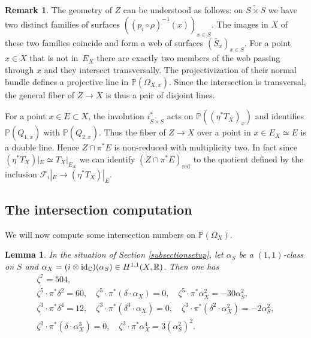 \documentclass[11pt]{article}
\let\mathcal\mathscr
\theoremstyle{plain}
\newtheorem{lemma}[theorem]{Lemma}
\theoremstyle{definition}
\newtheorem{remark}[theorem]{Remark}
\newcommand{\R}{\ensuremath{\mathbb{R}}}
\newcommand{\PP}{\ensuremath{\mathbb{P}}}
\newcommand{\fibre}[2]{\ensuremath{#1^{-1} (#2)}}
\newcommand\sF{{\mathcal F}}
\newcommand{\blS}{\ensuremath{\widetilde{S \times S}}}
\DeclareMathOperator{\id}{id}
\begin{document}
\begin{remark}
The geometry of $Z$ can be understood as follows: on $\blS$ we have two distinct families
of surfaces $(\fibre{(p_i \circ \rho)}{x})_{x \in S}$. The images in $X$ of these two families
coincide
and form a web of surfaces $(\bar S_x)_{x \in S}$. For a point $x \in X$ that is not in~$E_X$
there are exactly two members of the web passing through $x$ and they intersect transversally.
The projectivization of their normal bundle defines a projective line in $\PP(\Omega_{X,x})$.
Since the intersection is transversal, the general fiber of $Z \to X$ is thus a pair of disjoint
lines.

For a point $x \in E \subset X$, the involution $i_{\blS}^*$ acts on $\PP((\eta^* T_X)_x)$ and identifies
$\PP(Q_{1,x})$ with $\PP(Q_{2,x})$.
Thus the fiber of $Z \to X$ over a point in $x \in E_X \simeq E$ is a double line.
Hence $Z \cap \pi^* E$ is non-reduced with multiplicity two.
In fact since $(\eta^* T_X)|_E \simeq T_X|_{E_X}$ we can identify
$(Z \cap \pi^* E)_\mathrm{red}$ to the quotient defined by the inclusion
$\sF_i|_E \to (\eta^* T_X)|_E$.
\end{remark}

\subsection{The intersection computation} \label{subsectionnumbers}

We will now compute some intersection numbers on $\PP(\Omega_X)$.

\begin{lemma} \label{lemmanumbersX}
In the situation of Section \ref{subsectionsetup}, let $\alpha_S$ be a $(1,1)$-class on $S$
and $\alpha_X=(i \otimes \id_\C)(\alpha_S) \in H^{1,1}(X, \R)$. Then one has
\begin{gather*}
\zeta^7 = 504,
\\
\zeta^5 \cdot \pi^* \delta^2 = 60, \quad
\zeta^5 \cdot \pi^* (\delta \cdot \alpha_X) = 0, \quad
\zeta^5 \cdot \pi^* \alpha_X^2 = - 30 \alpha_S^2,
\\
\zeta^3 \cdot \pi^* \delta^4 = 12, \quad
\zeta^3 \cdot \pi^* (\delta^3 \cdot \alpha_X) = 0 , \quad
\zeta^3 \cdot \pi^* (\delta^2 \cdot \alpha_X^2) = - 2 \alpha_S^2, \\
\zeta^3 \cdot \pi^* (\delta \cdot \alpha_X^3) = 0, \quad
\zeta^3 \cdot \pi^* \alpha_X^4 = 3 (\alpha_S^2)^2.
\end{gather*}
\end{lemma}
\end{document}
